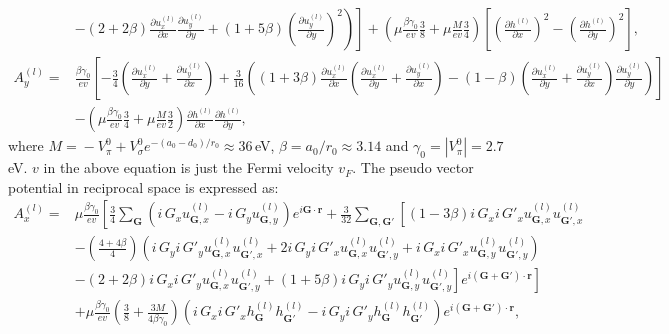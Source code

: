 \documentclass[aps,prx,10pt,twocolumn,superscriptaddress]{revtex4}
\begin{document}
\begin{widetext}
\begin{align}
&\left.\left.-(2+2\beta)\frac{\partial u^{(l)}_{x}}{\partial x}\frac{\partial u^{(l)}_{y}}{\partial y}+(1+5\beta)\left(\frac{\partial u^{(l)}_{y}}{\partial y}\right)^{2}\right)\right]\nonumber+\left(\mu\frac{\beta\gamma_{0}}{ev}\frac{3}{8}+\mu\frac{M}{ev}\frac{3}{4}\right)\left[\left(\frac{\partial h^{(l)}}{\partial x}\right)^{2}-\left(\frac{\partial h^{(l)}}{\partial y}\right)^{2}\right],\nonumber\\
A_{y}^{(l)}=&\frac{\beta\gamma_{0}}{ev}\left[-\frac{3}{4}\left(\frac{\partial u^{(l)}_{x}}{\partial y}+\frac{\partial u^{(l)}_{y}}{\partial x}\right)+\frac{3}{16}\left((1+3\beta)\frac{\partial u^{(l)}_{x}}{\partial x}\left(\frac{\partial u^{(l)}_{x}}{\partial y}+\frac{\partial u^{(l)}_{y}}{\partial x}\right)-(1-\beta)\left(\frac{\partial u^{(l)}_{x}}{\partial y}+\frac{\partial u^{(l)}_{y}}{\partial x}\right)\frac{\partial u^{(l)}_{y}}{\partial y}\right)\right]\nonumber\\
&-\left(\mu\frac{\beta\gamma_{0}}{ev}\frac{3}{4}+\mu\frac{M}{ev}\frac{3}{2}\right)\frac{\partial h^{(l)}}{\partial x}\frac{\partial h^{(l)}}{\partial y},
\end{align}
where $M\!=\!-V^{0}_{\pi}+V^{0}_{\sigma}e^{-(a_{0}-d_{0})/r_{0}}\!\approx\!36\,$eV, $\beta\!=\!a_{0}/r_{0}\!\approx\!3.14$ and $\gamma_{0}=\left|V^{0}_{\pi}\right|\!=\!2.7\,$ eV. $v$ in the above equation is just the Fermi velocity $v_F$.
The pseudo vector potential in reciprocal space is expressed as:
\allowdisplaybreaks
\begin{align}
A^{(l)}_{x}=&\mu\frac{\beta\gamma_{0}}{ev}\left[\frac{3}{4}\sum_{\textbf{G}}(i\,G_{x}u^{(l)}_{\textbf{G},x}-i\,G_{y}u^{(l)}_{\textbf{G},y})e^{i\textbf{G}\cdot\textbf{r}}+\frac{3}{32}\sum_{\textbf{G},\textbf{G}'}\left[(1-3\beta)i\,G_{x}i\,G'_{x}u^{(l)}_{\textbf{G},x}u^{(l)}_{\textbf{G}',x}\right.\right.\nonumber\\
&-(\frac{4+4\beta}{4})(i\,G_{y}i\,G'_{y}u^{(l)}_{\textbf{G},x}u^{(l)}_{\textbf{G}',x}+2i\,G_{y}i\,G'_{x}u^{(l)}_{\textbf{G},x}u^{(l)}_{\textbf{G}',y}+i\,G_{x}i\,G'_{x}u^{(l)}_{\textbf{G},y}u^{(l)}_{\textbf{G}',y})\nonumber\\
&-\left.\left.(2+2\beta)i\,G_{x}i\,G'_{y}u^{(l)}_{\textbf{G},x}u^{(l)}_{\textbf{G}',y}+(1+5\beta)i\,G_{y}i\,G'_{y}u^{(l)}_{\textbf{G},y}u^{(l)}_{\textbf{G}',y}\right]e^{i(\textbf{G}+\textbf{G}')\cdot\textbf{r}}\right]\nonumber\\
&+\mu\frac{\beta\gamma_{0}}{ev}\left(\frac{3}{8}+\frac{3M}{4\beta\gamma_{0}}\right)(i\,G_{x}i\,G'_{x}h^{(l)}_{\textbf{G}}h^{(l)}_{\textbf{G}'}-i\,G_{y}i\,G'_{y}h^{(l)}_{\textbf{G}}h^{(l)}_{\textbf{G}'})e^{i(\textbf{G}+\textbf{G}')\cdot\textbf{r}},\nonumber\\

\end{align}
\end{widetext}
\end{document}
